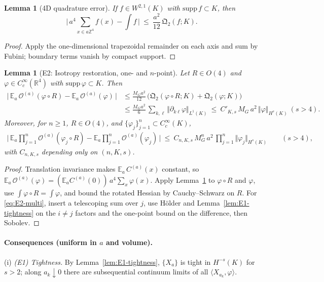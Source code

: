 \documentclass[11pt]{amsart}
\theoremstyle{plain}
\newtheorem{lemma}[theorem]{Lemma}
\theoremstyle{definition}
\theoremstyle{remark}
\renewcommand{\tfrac}[2]{\textstyle\frac{#1}{#2}}
\begin{document}
\begin{lemma}[4D quadrature error]\label{lem:4D-quadrature}
If $f\in W^{2,1}(K)$ with $\mathrm{supp}\,f\subset K$, then
\[
\Big|\,a^4\!\sum_{x\in a\mathbb Z^4} f(x)-\int f\,\Big|\ \le\ \tfrac{a^2}{12}\,\mathfrak Q_2(f;K).
\]
\end{lemma}
\begin{proof}
Apply the one-dimensional trapezoidal remainder on each axis and sum by Fubini; boundary terms vanish by compact support.
\end{proof}

\begin{lemma}[E2: Isotropy restoration, one- and $n$-point]\label{lem:E2-onepoint}
Let $R\in O(4)$ and $\varphi\in C_c^\infty(\mathbb R^4)$ with $\mathrm{supp}\,\varphi\subset K$. Then
\begin{align}
\big|\,\mathbb E_a\,\mathcal O^{(a)}(\varphi\!\circ\!R)-\mathbb E_a\,\mathcal O^{(a)}(\varphi)\,\big|
&\le \tfrac{M_G a^2}{12}\,\Big(\mathfrak Q_2(\varphi\!\circ\!R;K)+\mathfrak Q_2(\varphi;K)\Big)\\
&\le \tfrac{M_G a^2}{6}\,\sum_{k,\ell}\Vert\partial_{k\ell}\varphi\Vert_{L^1(K)}\ \le\ C'_{K,s}\,M_G\,a^2\,\Vert\varphi\Vert_{H^s(K)}\ (s>4).
\end{align}
Moreover, for $n\ge 1$, $R\in O(4)$, and $\{\varphi_j\}_{j=1}^n\subset C_c^\infty(K)$,
\begin{align}\label{eq:E2-multi}
\big|\,\mathbb E_a\!\prod_{j=1}^n\!\mathcal O^{(a)}(\varphi_j\!\circ\!R)-\mathbb E_a\!\prod_{j=1}^n\!\mathcal O^{(a)}(\varphi_j)\,\big|
\ \le\ C_{n,K,s}\,M_G^{n}\,a^2\,\prod_{j=1}^n\Vert\varphi_j\Vert_{H^s(K)}\qquad(s>4),
\end{align}
with $C_{n,K,s}$ depending only on $(n,K,s)$.
\end{lemma}
\begin{proof}
Translation invariance makes $\mathbb E_a\,C^{(a)}(x)$ constant, so $\mathbb E_a\,\mathcal O^{(a)}(\varphi)=(\mathbb E_a C^{(a)}(0))\,a^4\sum_x\varphi(x)$. Apply Lemma~\ref{lem:4D-quadrature} to $\varphi\circ R$ and $\varphi$, use $\int \varphi\circ R=\int \varphi$, and bound the rotated Hessian by Cauchy--Schwarz on $R$. For \eqref{eq:E2-multi}, insert a telescoping sum over $j$, use Hölder and Lemma~\ref{lem:E1-tightness} on the $i\ne j$ factors and the one-point bound on the difference, then Sobolev.
\end{proof}

\paragraph{Consequences (uniform in $a$ and volume).}
(i) \emph{(E1) Tightness.} By Lemma~\ref{lem:E1-tightness}, $\{X_a\}$ is tight in $H^{-s}(K)$ for $s>2$; along $a_k\downarrow 0$ there are subsequential continuum limits of all $\langle X_{a_k},\varphi\rangle$.
\end{document}
